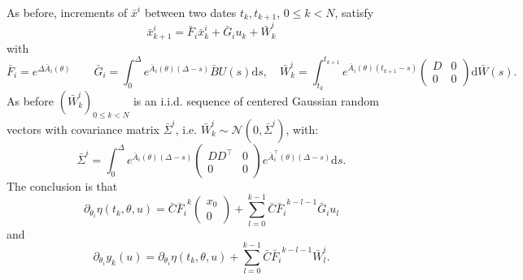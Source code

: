 \documentclass[twocolumn]{autart}
\theoremstyle{definition}
\theoremstyle{remark}
\newcommand{\diff}{\mathrm{d}}
\begin{document}
As before, increments of $\bar x^i$ between two dates $t_{k},t_{k+1}$, $0\leq k<N$, satisfy
\begin{equation}\label{E:rec1}
\bar x^i_{k+1}=\bar F_i \bar x^i_k
+
\bar G_i u_k
+
\bar W^i_k
\end{equation}
with
\begin{equation}
\bar F_i=e^{\Delta \bar A_i(\theta)}
\qquad 
\bar G_i
= 
\int_{0}^{\Delta}e^{\bar A_i(\theta)(\Delta-s)}\bar BU(s)\diff s,
\quad
\bar W_k^i=\int_{t_k}^{t_{k+1}}e^{\bar A_i(\theta)(t_{k+1}-s)}\begin{pmatrix}
D & 0
\\
0 & 0
\end{pmatrix} \diff \bar W(s).
\end{equation}
As before $(\bar W_k^i)_{0\leq k<N}$ is an i.i.d. sequence of centered Gaussian random vectors with covariance matrix $\bar\Sigma^i$, i.e. $\bar W_k^i\sim \mathcal{N}(0,\bar\Sigma^i)$, with:
$$
\bar\Sigma^i = \int_0^\Delta e^{\bar A_i(\theta)(\Delta-s)}
\begin{pmatrix}
D D^\top  & 0
\\
0 & 0
\end{pmatrix} 
e^{\bar A_i^\top(\theta)(\Delta-s)}\diff s.
$$
The conclusion is that 
\begin{equation}\label{eq:deta_dtheta}
\partial_{\theta_i}\eta(t_k,\theta,u)
=
\bar C
{\bar F_i}^{k}
\begin{pmatrix}
x_0\\0
\end{pmatrix}
+
\sum_{l=0}^{k-1} 
\bar C
{\bar F_i}^{k-l-1}{\bar G_i}u_{l} 
\end{equation}
and
\begin{equation}\label{eq:dy_dtheta}
\partial_{\theta_i}y_k(u)
=\partial_{\theta_i}\eta(t_k,\theta,u)+\sum_{l=0}^{k-1} \bar C {\bar F_i}^{k-l-1}{\bar W^i_l}.
\end{equation}
\end{document}
